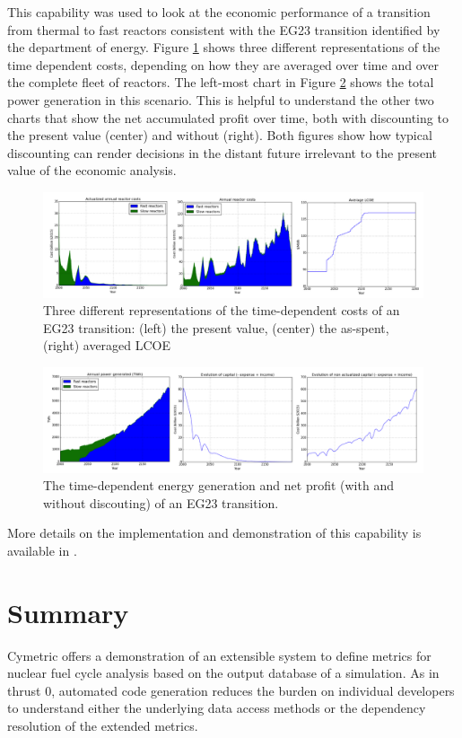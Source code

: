 This capability was used to look at the economic performance of a transition
from thermal to fast reactors consistent with the EG23 transition identified
by the department of energy.  Figure \ref{fig:econ-eg23-1} shows three
different representations of the time dependent costs, depending on how they
are averaged over time and over the complete fleet of reactors.  The left-most
chart in Figure \ref{fig:econ-eg23-2} shows the total power generation in this
scenario.  This is helpful to understand the other two charts that show the
net accumulated profit over time, both with discounting to the present value
(center) and without (right).  Both figures show how typical discounting can
render decisions in the distant future irrelevant to the present value of the
economic analysis.

\begin{figure}[htbp]
  \centering
  \includegraphics[width=\columnwidth]{./images/econ-eg23-1}
  \caption{Three different representations of the time-dependent costs of an
    EG23 transition: (left) the present value, (center) the as-spent, (right)
    averaged \gls{LCOE}}
  \label{fig:econ-eg23-1}
\end{figure}

\begin{figure}[htbp]
  \centering
  \includegraphics[width=\columnwidth]{./images/econ-eg23-2}
  \caption{The time-dependent energy generation and net profit (with and without
    discouting) of an EG23 transition.}
  \label{fig:econ-eg23-2}
\end{figure}


More details on the implementation and demonstration of this capability is
available in .  

\section{Summary}

Cymetric offers a demonstration of an extensible system to define metrics for
nuclear fuel cycle analysis based on the output database of a \Cyclus
simulation.  As in thrust 0, automated code generation reduces the burden on
individual developers to understand either the underlying data access methods
or the dependency resolution of the extended metrics.
